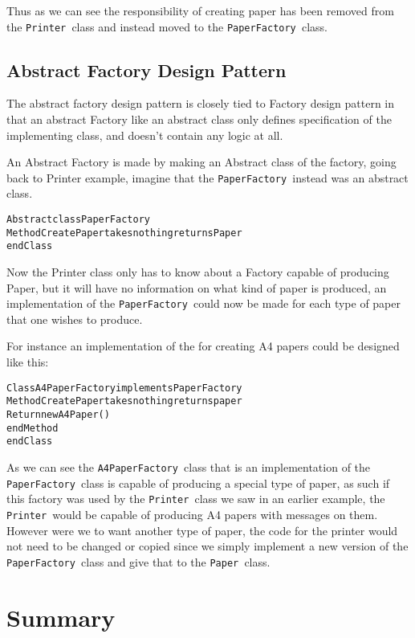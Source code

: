 Thus as we can see the responsibility of creating paper has been removed
from the \texttt{Printer }class and instead moved to the \texttt{PaperFactory
}class.


\subsection{Abstract Factory Design Pattern}

The abstract factory design pattern is closely tied to Factory design
pattern in that an abstract Factory like an abstract class only defines
specification of the implementing class, and doesn\textquoteright{}t
contain any logic at all. 

An Abstract Factory is made by making an Abstract class of the factory,
going back to Printer example, imagine that the \texttt{PaperFactory
}instead was an abstract class.

\begin{alltt}
Abstract class PaperFactory 	
    Method CreatePaper takes nothing returns Paper 
endClass
\end{alltt}

Now the Printer class only has to know about a Factory capable of
producing Paper, but it will have no information on what kind of paper
is produced, an implementation of the \texttt{PaperFactory }could
now be made for each type of paper that one wishes to produce.

For instance an implementation of the for creating A4 papers could
be designed like this:

\begin{alltt}
Class A4PaperFactory implements PaperFactory 	
    Method CreatePaper takes nothing returns paper 
        Return new A4Paper() 	
    endMethod 
endClass
\end{alltt}

As we can see the \texttt{A4PaperFactory }class that is an implementation
of the \texttt{PaperFactory }class is capable of producing a special
type of paper, as such if this factory was used by the \texttt{Printer
}class we saw in an earlier example, the \texttt{Printer }would be
capable of producing A4 papers with messages on them. However were
we to want another type of paper, the code for the printer would not
need to be changed or copied since we simply implement a new version
of the \texttt{PaperFactory }class and give that to the \texttt{Paper
}class.


\section*{Summary}

